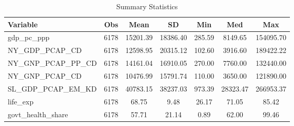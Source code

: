 \begin{table}
\centering
\caption{Summary Statistics}
\label{Sum_Stats}
\begin{tabular}{lcccccc}
\toprule
         Variable &  Obs &     Mean &       SD &    Min &      Med &       Max \\
\midrule
gdp\_pc\_ppp & 6178 & 15201.39 & 18386.40 & 285.59 & 8149.65 & 154095.70 \\
NY\_GDP\_PCAP\_CD & 6178 & 12598.95 & 20315.12 & 102.60 & 3916.60 & 189422.22 \\
NY\_GNP\_PCAP\_PP\_CD & 6178 & 14161.04 & 16910.05 & 270.00 & 7760.00 & 132440.00 \\
NY\_GNP\_PCAP\_CD & 6178 & 10476.99 & 15791.74 & 110.00 & 3650.00 & 121890.00 \\
SL\_GDP\_PCAP\_EM\_KD & 6178 & 40783.15 & 38237.03 & 973.39 & 28323.47 & 266953.37 \\
life\_exp & 6178 & 68.75 & 9.48 & 26.17 & 71.05 & 85.42 \\
govt\_health\_share & 6178 & 57.71 & 21.14 & 0.89 & 62.00 & 99.46 \\
\bottomrule
\end{tabular}
\end{table}

